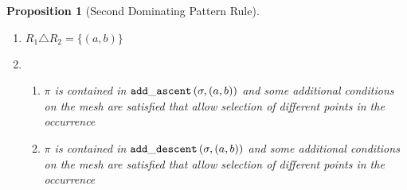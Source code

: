 \documentclass[11pt,a4paper]{article}
\newtheorem{proposition}[theorem]{Proposition}
\begin{document}
\begin{proposition}[Second Dominating Pattern Rule]
    \begin{enumerate}
        \item \(R_1 \triangle R_2 = \{(a,b)\}\)
        \item   \begin{enumerate}
                \item\label{prop:dom2:condc} \(\pi \) is contained in
                \( \mathtt{add\_ascent}\left(\sigma, (a,b)\right)\) and some additional conditions on the
                mesh are satisfied that allow selection of different points in
                the occurrence
                \item \(\pi \) is contained in \( \mathtt{add\_descent}\left(\sigma, (a,b)\right)\) and
                some additional conditions on the
                mesh are satisfied that allow selection of different points in
                the occurrence
                \end{enumerate}
    \end{enumerate}
\end{proposition}
\end{document}
